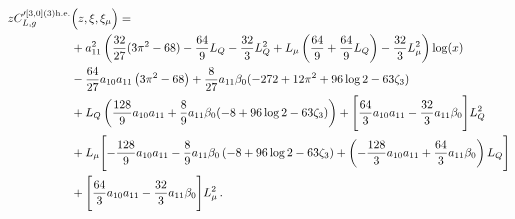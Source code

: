 \documentclass[a4paper]{article}
\begin{document}
	\endgroup
\begingroup
\allowdisplaybreaks
\begin{align}
		z C_{L,g}'^{[3, 0](3) \rm h.e.}&\Bigl(z,\xi,\xi_\mu\Bigr)= \notag\\
		& + a_{11}^2 \left(\frac{32}{27} (3 \pi^2 - 68) - \frac{64}{9} L_Q - \frac{32}{3} L_Q^2 + L_\mu \left(\frac{64}{9} + \frac{64}{9} L_Q\right)- \frac{32}{3} L_\mu^2\right) \log(x) \notag\\
		& -\frac{64}{27} a_{10} a_{11} \left(3 \pi^2 - 68\right) + \frac{8}{27} a_{11} \beta_0 (-272 + 12 \pi^2 + 96 \log 2 - 63 \zeta_3) \notag\\
		& + L_Q \left(\frac{128}{9} a_{10} a_{11} + \frac{8}{9} a_{11} \beta_0 (-8 + 96 \log 2 - 63 \zeta_3)\right) + \Biggl[ \frac{64}{3} a_{10} a_{11} - \frac{32}{3} a_{11} \beta_0\Biggr] L_Q^2 \notag\\
		& + L_\mu \Biggl[- \frac{128}{9} a_{10} a_{11} - \frac{8}{9} a_{11} \beta_0 \left(-8 + 96 \log 2 - 63 \zeta_3\right) + \left(- \frac{128}{3} a_{10} a_{11} + \frac{64}{3} a_{11} \beta_0 \right) L_Q \Biggr] \notag\\
		& + \Biggl[\frac{64}{3} a_{10} a_{11} - \frac{32}{3} a_{11} \beta_0 \Biggr] L_\mu^2\,.
	\end{align}
	\endgroup
\end{document}
